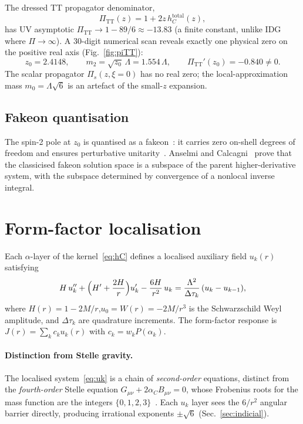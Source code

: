 \documentclass[a4paper,12pt]{article}
\newcommand{\Lam}{\Lambda}
\newcommand{\PiTT}{\Pi_{\mathrm{TT}}}
\begin{document}
The dressed TT propagator denominator,
\begin{equation}\label{eq:PiTT}
  \PiTT(z)=1+2z\,h_C^{\mathrm{total}}(z),
\end{equation}
has UV asymptotic $\PiTT\to 1-89/6\approx-13.83$ (a finite
constant, unlike IDG where $\Pi\to\infty$).
A 30-digit numerical scan reveals exactly one physical zero on the
positive real axis (Fig.~\ref{fig:piTT}):
\begin{equation}
  z_0 = 2.4148,\qquad
  m_2 = \sqrt{z_0}\,\Lam = 1.554\,\Lam,
  \qquad\PiTT'(z_0)=-0.840\neq 0.
\end{equation}
The scalar propagator $\Pi_s(z,\xi\!=\!0)$ has no real zero; the
local-approximation mass $m_0=\Lam\sqrt{6}$ is an artefact of the
small-$z$ expansion.

\subsection{Fakeon quantisation}

The spin-2 pole at $z_0$ is quantised as a fakeon~\cite{Anselmi2018}:
it carries zero on-shell degrees of freedom and ensures perturbative
unitarity~\cite{Anselmi2019}.
Anselmi and Calcagni~\cite{AnselmiCalcagni2025} prove that the
classicised fakeon solution space is a subspace of the parent
higher-derivative system, with the subspace determined by
convergence of a nonlocal inverse integral.

\section{Form-factor localisation}\label{sec:local}

Each $\alpha$-layer of the kernel~\eqref{eq:hC} defines a localised
auxiliary field $u_k(r)$ satisfying
\begin{equation}\label{eq:uk}
  H\,u_k'' + \Bigl(H'+\frac{2H}{r}\Bigr)u_k'
  - \frac{6H}{r^2}\,u_k
  = \frac{\Lam^2}{\Delta\tau_k}\,(u_k-u_{k-1}),
\end{equation}
where $H(r)=1-2M/r$,\;$u_0=W(r)=-2M/r^3$ is the Schwarzschild Weyl
amplitude, and $\Delta\tau_k$ are quadrature increments.
The form-factor response is $J(r)=\sum_k c_k u_k(r)$ with
$c_k=w_k P(\alpha_k)$.

\paragraph{Distinction from Stelle gravity.}
The localised system~\eqref{eq:uk} is a chain of \emph{second-order}
equations, distinct from the \emph{fourth-order} Stelle equation
$G_{\mu\nu}+2\alpha_C B_{\mu\nu}=0$, whose Frobenius roots for the
mass function are the integers $\{0,1,2,3\}$~\cite{LPPS2015}.
Each $u_k$ layer sees the $6/r^2$ angular barrier directly, producing
irrational exponents $\pm\sqrt{6}$ (Sec.~\ref{sec:indicial}).
\end{document}
